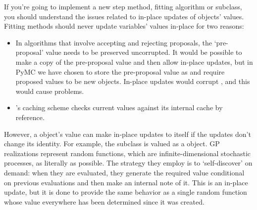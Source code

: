 If you're going to implement a new step method, fitting algorithm or  subclass, you should understand the issues related to in-place updates of  objects' values. Fitting methods should never update variables' values in-place for two reasons:
\begin{itemize}
   \item In algorithms that involve accepting and rejecting proposals, the `pre-proposal' value needs to be preserved uncorrupted. It would be possible to make a copy of the pre-proposal value and then allow in-place updates, but in PyMC we have chosen to store the pre-proposal value as  and require proposed values to be new objects. In-place updates would corrupt , and this would cause problems.
   \item {}'s caching scheme checks current values against its internal cache by reference.
\end{itemize}

However, a  object's value can make in-place updates to itself if the updates don't change its identity. For example, the  subclass  is valued as a  object. GP realizations represent random functions, which are infinite-dimensional stochastic processes, as literally as possible. The strategy they employ is to `self-discover' on demand: when they are evaluated, they generate the required value conditional on previous evaluations and then make an internal note of it. This is an in-place update, but it is done to provide the same behavior as a single random function whose value everywhere has been determined since it was created.